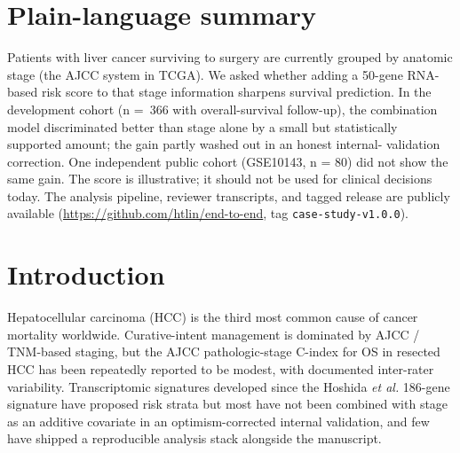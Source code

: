 \documentclass[12pt]{article}
\newcommand{\HCCRTS}{HCC-TRS\xspace}
\begin{document}
\begin{abstract}
\textbf{Conclusion.}
On the TCGA-LIHC development cohort, the prespecified \HCCRTS
improves OS discrimination beyond AJCC pathologic stage by a margin
that meets the Layer-1 preregistration threshold. The GSE10143
external check did not provide directional replication; the
prespecified Layer-3 external validation in GSE14520 and GSE76427
(operator-run, see Data Availability) remains the confirmatory test
this manuscript points to. Findings apply to the resected,
surgical-candidate HCC population represented in TCGA-LIHC (broadly
BCLC~0/A); the score is not evaluated in BCLC~C/D disease. AJCC
pathologic stage, not BCLC, is the comparator here because TCGA-LIHC
records the former only. \HCCRTS is illustrative and is not intended
for clinical use.
\end{abstract}

\section*{Plain-language summary}

\noindent Patients with liver cancer surviving to surgery are
currently grouped by anatomic stage (the AJCC system in TCGA). We
asked whether adding a 50-gene RNA-based risk score to that stage
information sharpens survival prediction. In the development cohort
(n =~366 with overall-survival follow-up), the combination model
discriminated better than stage alone by a small but statistically
supported amount; the gain partly washed out in an honest internal-
validation correction. One independent public cohort (GSE10143, n =
80) did not show the same gain. The score is illustrative; it should
not be used for clinical decisions today. The analysis pipeline,
reviewer transcripts, and tagged release are publicly available
(\url{https://github.com/htlin/end-to-end}, tag
\texttt{case-study-v1.0.0}).

\section{Introduction}

Hepatocellular carcinoma (HCC) is the third most common cause of
cancer mortality worldwide.\citep{villanueva2019hepatocellular,llovet2018hepatocellular,vogel2022hepatocellular}
Curative-intent management is dominated by AJCC / TNM-based staging,
but the AJCC pathologic-stage C-index for OS in resected HCC has
been repeatedly reported to be modest, with documented inter-rater
variability.\citep{calderaro2019molecular,singal2023aasld} Transcriptomic
signatures developed since the Hoshida \emph{et al.} 186-gene
signature\citep{hoshida2008gene} have proposed risk strata but most
have not been combined with stage as an additive covariate in an
optimism-corrected internal validation, and few have shipped a
reproducible analysis stack alongside the manuscript.
\end{document}
